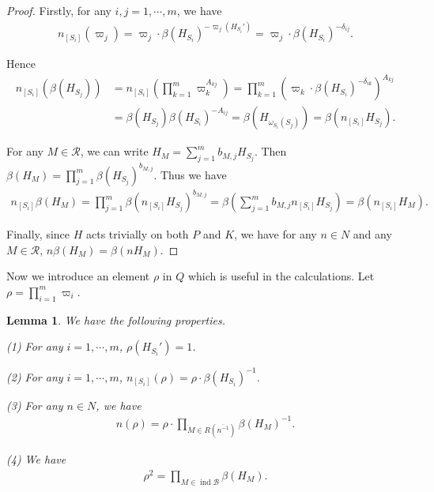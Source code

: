 \documentclass[12pt]{amsart}
\newtheorem{lemma}[theorem]{Lemma}
\begin{document}
\begin{proof}
    Firstly, for any $i,j=1,\cdots,m$, we have 
    \begin{align*}
        n_{[S_i]}(\varpi_j) = \varpi_j \cdot \beta(H_{S_i})^{-\varpi_j(H_{S_i}')} = \varpi_j \cdot \beta(H_{S_i})^{-\delta_{ij}}.
    \end{align*}

    Hence  
    \begin{align*}
        n_{[S_i]}(\beta(H_{S_j})) &= n_{[S_i]}(\prod_{k=1}^m \varpi_k^{A_{kj}}) = \prod_{k=1}^m (\varpi_k\cdot \beta(H_{S_i})^{-\delta_{ik}})^{A_{kj}} \\
        &= \beta(H_{S_j}) \beta(H_{S_i})^{-A_{ij}} = \beta(H_{\omega_{S_i}(S_j)}) = \beta(n_{[S_i]}H_{S_j}).
    \end{align*}
    
    For any $M\in \mathcal{R}$, we can write $H_M = \sum_{j=1}^m b_{M,j}H_{S_j}$.
    Then $\beta(H_M) = \prod_{j=1}^m \beta(H_{S_j})^{b_{M,j}}$.
    Thus we have 
    \begin{align*}
        n_{[S_i]}\beta(H_M) = \prod_{j=1}^m \beta(n_{[S_i]}H_{S_j})^{b_{M,j}} = \beta(\sum_{j=1}^m b_{M,j} n_{[S_i]}H_{S_j}) = \beta(n_{[S_i]}H_M).
    \end{align*}

    Finally, since $H$ acts trivially on both $P$ and $K$, we have for any $n\in N$ and any $M\in \mathcal{R}$, $n\beta(H_M) = \beta(nH_M)$.
\end{proof}

Now we introduce an element $\rho$ in $Q$ which is useful in the calculations.
Let $\rho = \prod_{i=1}^m \varpi_i$. 

\begin{lemma}\label{rhoprop}
    We have the following properties.

    (1) For any $i=1,\cdots,m$, $\rho(H_{S_i}') = 1$. 

    (2) For any $i=1,\cdots,m$, $n_{[S_i]}(\rho) = \rho \cdot \beta(H_{S_i})^{-1}$.

    (3) For any $n\in N$, we have 
    \begin{align*}
        n(\rho) = \rho \cdot \prod_{M\in R(\overline{n^{-1}})} \beta(H_M)^{-1}.
    \end{align*}

    (4) We have 
    \begin{align*}
        \rho^2 = \prod_{M\in \operatorname{ind}\mathcal{B}} \beta(H_M).
    \end{align*}
   
\end{lemma}
\end{document}
